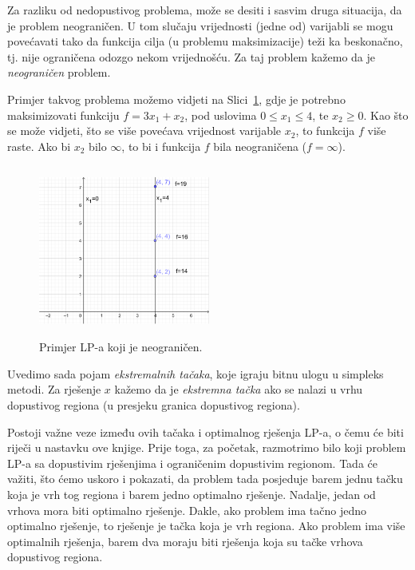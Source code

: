 \documentclass[a4paper, utf8, 11pt, colorlinks]{book}
\begin{document}
 Za razliku od nedopustivog problema, može se desiti i sasvim druga situacija, da je problem neograničen. U tom slučaju vrijednosti (jedne od) varijabli se mogu povećavati tako da funkcija cilja (u problemu maksimizacije) teži ka beskonačno, tj. nije ograničena odozgo nekom vrijednošću. Za taj problem kažemo da je \emph{neograničen} problem.
 
 Primjer takvog problema možemo vidjeti na Slici~\ref{fig:unbounded_solution}, gdje je potrebno maksimizovati funkciju $f = 3 x_1 + x_2$, pod uslovima $0\leq x_1 \leq 4$, te $x_2 \geq 0$. Kao što se može vidjeti, što se više povećava vrijednost varijable $x_2$, to funkcija $f$ više raste. Ako bi $x_2$ bilo $\infty$, to bi i funkcija $f$ bila neograničena ($f = \infty$).
 
  \begin{figure}
     \centering
     \includegraphics[width=160pt, height=160pt]{fig4.eps}
     \caption{Primjer LP-a koji je neograničen.}
     \label{fig:unbounded_solution}
 \end{figure}
 
Uvedimo sada pojam \emph{ekstremalnih tačaka}, koje igraju bitnu ulogu u simpleks metodi. Za rješenje $x$ kažemo da je \emph{ekstremna tačka} ako se nalazi u vrhu dopustivog regiona (u presjeku granica dopustivog regiona).

Postoji važne veze između ovih tačaka i optimalnog rješenja LP-a, o čemu će biti riječi u nastavku ove knjige.
Prije toga, za početak, razmotrimo bilo koji problem LP-a sa dopustivim rješenjima i ograničenim dopustivim regionom. Tada će važiti, što ćemo uskoro i pokazati, da problem tada posjeduje barem jednu tačku koja je vrh tog regiona i barem jedno optimalno rješenje. Nadalje, jedan od vrhova mora biti optimalno rješenje. Dakle, ako problem ima tačno jedno optimalno rješenje, to rješenje je tačka koja je vrh regiona. Ako problem ima više optimalnih rješenja, barem dva moraju biti rješenja koja su tačke  vrhova dopustivog regiona.
\end{document}
